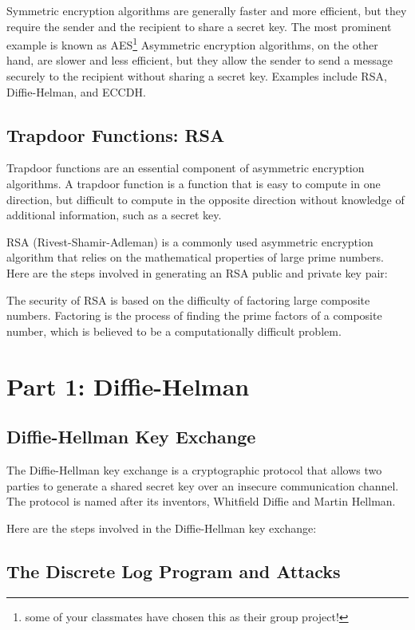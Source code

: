 \documentclass{article}
\begin{document}
Symmetric encryption algorithms are generally faster and more efficient, but they require the sender and the recipient to share a secret key. The most prominent example is known as AES\footnote{some of your classmates have chosen this as their group project!} Asymmetric encryption algorithms, on the other hand, are slower and less efficient, but they allow the sender to send a message securely to the recipient without sharing a secret key. Examples include RSA, Diffie-Helman, and ECCDH.

\subsection*{Trapdoor Functions: RSA}

Trapdoor functions are an essential component of asymmetric encryption algorithms. A trapdoor function is a function that is easy to compute in one direction, but difficult to compute in the opposite direction without knowledge of additional information, such as a secret key.

RSA (Rivest-Shamir-Adleman) is a commonly used asymmetric encryption algorithm that relies on the mathematical properties of large prime numbers. Here are the steps involved in generating an RSA public and private key pair:

The security of RSA is based on the difficulty of factoring large composite numbers. Factoring is the process of finding the prime factors of a composite number, which is believed to be a computationally difficult problem.

\section*{Part 1: Diffie-Helman}

\subsection*{Diffie-Hellman Key Exchange}

The Diffie-Hellman key exchange is a cryptographic protocol that allows two parties to generate a shared secret key over an insecure communication channel. The protocol is named after its inventors, Whitfield Diffie and Martin Hellman.

Here are the steps involved in the Diffie-Hellman key exchange:

\subsection{The Discrete Log Program and Attacks}
\end{document}
